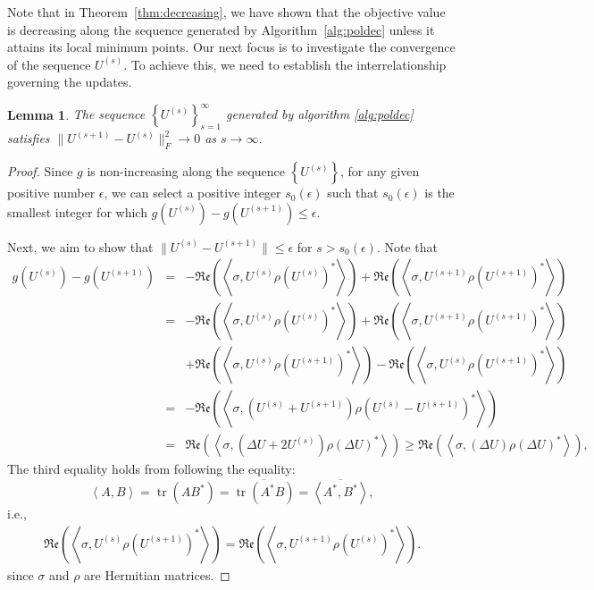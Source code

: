 \documentclass[sn-mathphys-num]{sn-jnl}%
\newtheorem{lemma}{Lemma}[section]
\newcommand{\rinner}[1]{\mathfrak{Re}\left(\left<#1\right>\right)}
\newcommand{\inner}[1]{\left<#1\right>}
\theoremstyle{thmstyleone}%
\theoremstyle{thmstyletwo}%
\theoremstyle{thmstylethree}%
\begin{document}
Note that in Theorem~\ref{thm:decreasing}, we have shown that the objective value is decreasing along the sequence generated by Algorithm~\ref{alg:poldec} unless it attains its local minimum points. Our next focus is to investigate the convergence of the sequence $ U^{(s)}$. To achieve this, we need to establish the interrelationship governing the updates.
%
\begin{lemma}\label{lemm:sub}
    The sequence $\left\{U^{(s)}\right\}_{s=1}^\infty$ generated by algorithm \ref{alg:poldec} satisfies $\|U^{(s+1)}-U^{(s)}\|_F^2\rightarrow 0 $ as $s\rightarrow\infty$.
\end{lemma}
%
%
%
\begin{proof}
Since $g$ is non-increasing along the sequence $\left\{ U^{(s)} \right\}$, 
for any given positive number $\epsilon$, 
we can select a positive integer $s_0(\epsilon)$ such that $s_0(\epsilon)$ is the smallest integer for which $g(U^{(s)}) - g(U^{(s+1)}) \leq \epsilon$.

Next, we aim to show that
$\|U^{(s)}-U^{(s+1)}\|\leq \epsilon$ for $s>s_0(\epsilon)$. Note that 
{\footnotesize
 \begin{eqnarray*}
        g(U^{(s)}) - g(U^{(s+1)}) &=& -\rinner{\sigma, U^{(s)}\rho \left(U^{(s)}\right)^*}+\rinner{\sigma, U^{(s+1)}\rho \left(U^{(s+1)}\right)^*}\\
        &=&  -\rinner{\sigma, U^{(s)}\rho \left(U^{(s)}\right)^*}+\rinner{\sigma, U^{(s+1)}\rho \left(U^{(s+1)}\right)^*}\\
        && +\rinner{\sigma, U^{(s)}\rho \left(U^{(s+1)}\right)^*}-\rinner{\sigma, U^{(s)}\rho \left(U^{(s+1)}\right)^*}\\
        &=& -\rinner{\sigma, \left(U^{(s)}+U^{(s+1)}\right)\rho \left(U^{(s)}-U^{(s+1)}\right)^*}\\
        &=& \rinner{\sigma, \left(\Delta U+2U^{(s)}\right)\rho \left(\Delta U\right)^*}\geq \rinner{\sigma, \left(\Delta U\right)\rho \left(\Delta U\right)^*},
\end{eqnarray*}
}
The third equality holds from following the equality: 
{
\begin{equation*}
\inner{A, B} = \operatorname{tr}(AB^*) = \overline{\operatorname{tr}(A^*B)} = \overline{\inner{A^*, B^*}},
\end{equation*}
}
i.e., 
\begin{eqnarray*}
\rinner{\sigma, U^{(s)}\rho \left(U^{(s+1)}\right)^*} = \rinner{\sigma, U^{(s+1)}\rho \left(U^{(s)}\right)^*}.
\end{eqnarray*}
since $\sigma$ and $\rho$ are Hermitian matrices. 


\end{proof}
\end{document}
